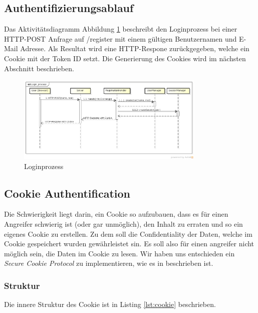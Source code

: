 \subsection{Authentifizierungsablauf}

Das Aktivitätsdiagramm Abbildung \ref{fig:process} beschreibt den Loginprozess bei einer HTTP-POST Anfrage auf /register mit einem gültigen Benutzernamen und E-Mail Adresse.
Als Resultat wird eine HTTP-Respone zurückgegeben, welche ein Cookie mit der Token ID setzt. Die Generierung des Cookies wird im nächsten Abschnitt beschrieben.

\begin{figure}[H]
	\begin{center}
		\includegraphics[width=0.8\textwidth]{./content/Login_process.png}
	\end{center}
	\caption{Loginprozess}
	\label{fig:process}
\end{figure}

\subsection{Cookie Authentification}

Die Schwierigkeit liegt darin, ein Cookie so aufzubauen, dass es für einen Angreifer schwierig ist (oder gar unmöglich), den Inhalt zu
erraten und so ein eigenes Cookie zu erstellen. Zu dem soll die Confidentiality der Daten, welche im Cookie gespeichert wurden
gewährleistet sin. Es soll also für einen angreifer nicht möglich sein, die Daten im Cookie zu lesen. Wir haben uns entschieden
ein \textit{Secure Cookie Protocol} zu implementieren, wie es in \cite{securecookie} beschrieben ist.

\subsubsection{Struktur}

Die innere Struktur des Cookie ist in Listing \ref{lst:cookie} beschrieben.

